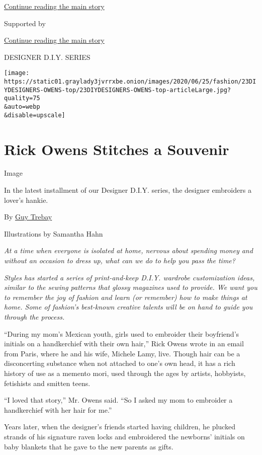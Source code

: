 \protect\hyperlink{after-top}{Continue reading the main story}

Supported by

\protect\hyperlink{after-sponsor}{Continue reading the main story}

DESIGNER D.I.Y. SERIES

\texttt{[image: https://static01.graylady3jvrrxbe.onion/images/2020/06/25/fashion/23DIYDESIGNERS-OWENS-top/23DIYDESIGNERS-OWENS-top-articleLarge.jpg?quality=75\\\&auto=webp\\\&disable=upscale]}

\hypertarget{rick-owens-stitches-a-souvenir}{%
\section{Rick Owens Stitches a
Souvenir}\label{rick-owens-stitches-a-souvenir}}

Image

In the latest installment of our Designer D.I.Y. series, the designer
embroiders a lover's hankie.

By \href{https://www.nytimes3xbfgragh.onion/by/guy-trebay}{Guy Trebay}

Illustrations by Samantha Hahn

\emph{At a time when everyone is isolated at home, nervous about
spending money and without an occasion to dress up, what can we do to
help you pass the time?}

\emph{Styles has started a series of print-and-keep D.I.Y. wardrobe
customization ideas, similar to the sewing patterns that glossy
magazines used to provide. We want you to remember the joy of fashion
and learn (or remember) how to make things at home. Some of fashion's
best-known creative talents will be on hand to guide you through the
process.}

``During my mom's Mexican youth, girls used to embroider their
boyfriend's initials on a handkerchief with their own hair,'' Rick Owens
wrote in an email from Paris, where he and his wife, Michele Lamy, live.
Though hair can be a disconcerting substance when not attached to one's
own head, it has a rich history of use as a memento mori, used through
the ages by artists, hobbyists, fetishists and smitten teens.

``I loved that story,'' Mr. Owens said. ``So I asked my mom to embroider
a handkerchief with her hair for me.''

Years later, when the designer's friends started having children, he
plucked strands of his signature raven locks and embroidered the
newborns' initials on baby blankets that he gave to the new parents as
gifts.

